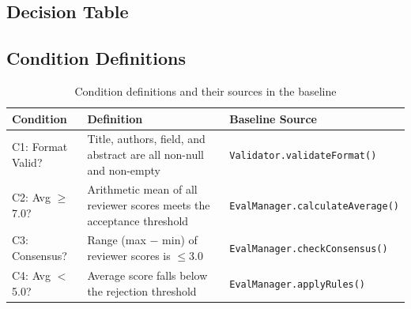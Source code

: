 \documentclass[12pt, a4paper]{article}
\begin{document}
\subsection{Decision Table}

\begin{table}[H]
\centering
\caption{Decision table for the ISRS evaluation logic}
\label{tab:decision-table}
\end{table}

\subsection{Condition Definitions}

\begin{table}[H]
\centering
\caption{Condition definitions and their sources in the baseline}
\label{tab:condition-defs}
\begin{tabularx}{\textwidth}{l X l}
    \toprule
    \textbf{Condition} & \textbf{Definition} & \textbf{Baseline Source} \\
    \midrule
    C1: Format Valid? & Title, authors, field, and abstract are all non-null and non-empty & \texttt{Validator.validateFormat()} \\
    C2: Avg $\geq$ 7.0? & Arithmetic mean of all reviewer scores meets the acceptance threshold & \texttt{EvalManager.calculateAverage()} \\
    C3: Consensus? & Range (max $-$ min) of reviewer scores is $\leq 3.0$ & \texttt{EvalManager.checkConsensus()} \\
    C4: Avg $<$ 5.0? & Average score falls below the rejection threshold & \texttt{EvalManager.applyRules()} \\
    \bottomrule
\end{tabularx}
\end{table}
\end{document}
